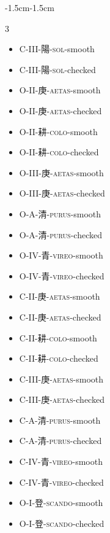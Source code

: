 \begin{adjustwidth}{-1.5cm}{-1.5cm}
\begin{multicols}{3}
\begin{itemize}[label={}, leftmargin=*]
  \item C-III-陽-\textsc{sol}-smooth \hfill {}
  \item C-III-陽-\textsc{sol}-checked \hfill {}
  \item O-II-庚-\textsc{aetas}-smooth \hfill {}
  \item O-II-庚-\textsc{aetas}-checked \hfill {}

  \item O-II-耕-\textsc{colo}-smooth \hfill {}
  \item O-II-耕-\textsc{colo}-checked \hfill {}
  \item O-III-庚-\textsc{aetas}-smooth \hfill {}
  \item O-III-庚-\textsc{aetas}-checked \hfill {}

  \item O-A-清-\textsc{purus}-smooth \hfill {}
  \item O-A-清-\textsc{purus}-checked \hfill {}
  \item O-IV-青-\textsc{vireo}-smooth \hfill {}
  \item O-IV-青-\textsc{vireo}-checked  \hfill {}

  \item C-II-庚-\textsc{aetas}-smooth \hfill {}
  \item C-II-庚-\textsc{aetas}-checked \hfill {}
  \item C-II-耕-\textsc{colo}-smooth \hfill {}
  \item C-II-耕-\textsc{colo}-checked
\hfill {}
  \item C-III-庚-\textsc{aetas}-smooth \hfill {}
  \item C-III-庚-\textsc{aetas}-checked \hfill {}
  \item C-A-清-\textsc{purus}-smooth \hfill {}
  \item C-A-清-\textsc{purus}-checked \hfill {}

  \item C-IV-青-\textsc{vireo}-smooth \hfill {}
  \item C-IV-青-\textsc{vireo}-checked \hfill {}  
  \item O-I-登-\textsc{scando}-smooth \hfill {}
  \item O-I-登-\textsc{scando}-checked \hfill {}


\end{itemize}
\end{multicols}
\end{adjustwidth}
